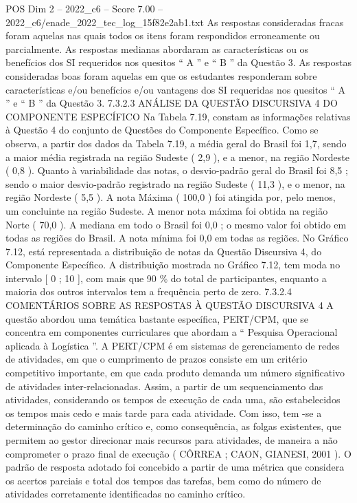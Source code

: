 \begin{textsample}{POS Dim 2 – 2022\_c6 – Score 7.00 – 2022\_c6/enade\_2022\_tec\_log\_15f82e2ab1.txt}
As respostas consideradas fracas foram aquelas nas quais todos os itens foram respondidos erroneamente ou parcialmente.
As respostas medianas abordaram as características ou os benefícios dos SI requeridos nos quesitos “ A ” e “ B ” da Questão 3.
As respostas consideradas boas foram aquelas em que os estudantes responderam sobre características e/ou benefícios e/ou vantagens dos SI requeridas nos quesitos “ A ” e “ B ” da Questão 3. 7.3.2.3 ANÁLISE DA QUESTÃO DISCURSIVA 4 DO COMPONENTE ESPECÍFICO Na Tabela 7.19, constam as informações relativas à Questão 4 do conjunto de Questões do Componente Específico.
Como se observa, a partir dos dados da Tabela 7.19, a média geral do Brasil foi 1,7, sendo a maior média registrada na região Sudeste ( 2,9 ), e a menor, na região Nordeste ( 0,8 ).
Quanto à variabilidade das notas, o desvio-padrão geral do Brasil foi 8,5 ; sendo o maior desvio-padrão registrado na região Sudeste ( 11,3 ), e o menor, na região Nordeste ( 5,5 ).
A nota Máxima ( 100,0 ) foi atingida por, pelo menos, um concluinte na região Sudeste.
A menor nota máxima foi obtida na região Norte ( 70,0 ).
A mediana em todo o Brasil foi 0,0 ; o mesmo valor foi obtido em todas as regiões do Brasil.
A nota mínima foi 0,0 em todas as regiões.
No Gráfico 7.12, está representada a distribuição de notas da Questão Discursiva 4, do Componente Específico.
A distribuição mostrada no Gráfico 7.12, tem moda no intervalo [ 0 ; 10 ], com mais que 90 \% do total de participantes, enquanto a maioria dos outros intervalos tem a frequência perto de zero. 7.3.2.4 COMENTÁRIOS SOBRE AS RESPOSTAS À QUESTÃO DISCURSIVA 4 A questão abordou uma temática bastante específica, PERT/CPM, que se concentra em componentes curriculares que abordam a “ Pesquisa Operacional aplicada à Logística ”.
A PERT/CPM é em sistemas de gerenciamento de redes de atividades, em que o cumprimento de prazos consiste em um critério competitivo importante, em que cada produto demanda um número significativo de atividades inter-relacionadas.
Assim, a partir de um sequenciamento das atividades, considerando os tempos de execução de cada uma, são estabelecidos os tempos mais cedo e mais tarde para cada atividade.
Com isso, tem -se a determinação do caminho crítico e, como consequência, as folgas existentes, que permitem ao gestor direcionar mais recursos para atividades, de maneira a não comprometer o prazo final de execução ( CÔRREA ; CAON, GIANESI, 2001 ).
O padrão de resposta adotado foi concebido a partir de uma métrica que considera os acertos parciais e total dos tempos das tarefas, bem como do número de atividades corretamente identificadas no caminho crítico.

\end{textsample}
